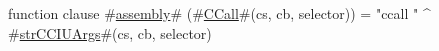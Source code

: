 function clause #\hyperref[sailMIPSzassembly]{assembly}# (#\hyperref[sailMIPSzCCall]{CCall}#(cs, cb, selector)) = "ccall " ^ #\hyperref[sailMIPSzstrCCIUArgs]{strCCIUArgs}#(cs, cb, selector)
